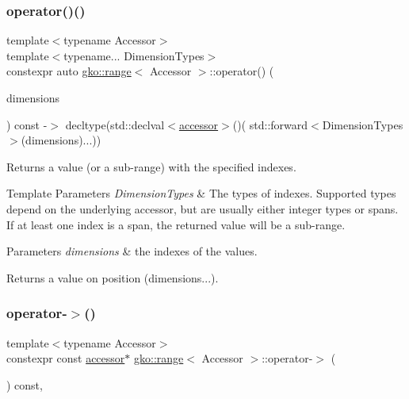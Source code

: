 \subsubsection{\texorpdfstring{operator()()}{operator()()}}
{\footnotesize\ttfamily template$<$typename Accessor$>$ \\
template$<$typename... Dimension\+Types$>$ \\
constexpr auto \hyperlink{classgko_1_1range}{gko\+::range}$<$ Accessor $>$\+::operator() (\begin{DoxyParamCaption}\item[{Dimension\+Types \&\&...}]{dimensions }\end{DoxyParamCaption}) const -\/$>$ decltype(std\+::declval$<$\hyperlink{classgko_1_1range_a3332728e51dadcf6517847cef3000a17}{accessor}$>$()(
            std\+::forward$<$Dimension\+Types$>$(dimensions)...))
    \hspace{0.3cm}{\ttfamily [inline]}}



Returns a value (or a sub-\/range) with the specified indexes. 


\begin{DoxyTemplParams}{Template Parameters}
{\em Dimension\+Types} & The types of indexes. Supported types depend on the underlying accessor, but are usually either integer types or spans. If at least one index is a span, the returned value will be a sub-\/range.\\
\hline
\end{DoxyTemplParams}

\begin{DoxyParams}{Parameters}
{\em dimensions} & the indexes of the values.\\
\hline
\end{DoxyParams}
\begin{DoxyReturn}{Returns}
a value on position {\ttfamily (dimensions...)}. 
\end{DoxyReturn}
\mbox{\label{classgko_1_1range_ad846fcf80cb6cd8881cd7dd8dddc6ca9}} 
\subsubsection{\texorpdfstring{operator-\/$>$()}{operator->()}}
{\footnotesize\ttfamily template$<$typename Accessor$>$ \\
constexpr const \hyperlink{classgko_1_1range_a3332728e51dadcf6517847cef3000a17}{accessor}$\ast$ \hyperlink{classgko_1_1range}{gko\+::range}$<$ Accessor $>$\+::operator-\/$>$ (\begin{DoxyParamCaption}{ }\end{DoxyParamCaption}) const\hspace{0.3cm}{\ttfamily [inline]}, {\ttfamily [noexcept]}}



